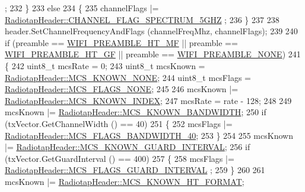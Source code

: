 \begin{DoxyCode}
      ;
232           \}
233         \textcolor{keywordflow}{else}
234           \{
235             channelFlags |= \hyperlink{classns3_1_1RadiotapHeader_a26df5fbb86499c692bd97a99781c8140acfb568bbac292324781feea8775ea1a1}{RadiotapHeader::CHANNEL\_FLAG\_SPECTRUM\_5GHZ}
      ;
236           \}
237 
238         header.SetChannelFrequencyAndFlags (channelFreqMhz, channelFlags);
239 
240         \textcolor{keywordflow}{if} (preamble == \hyperlink{group__wifi_gga5e94a56cb338a14ffbbb19c6a41251ebae0944a664debb28943c12d4cd7a81d2a}{WIFI\_PREAMBLE\_HT\_MF} || preamble == 
      \hyperlink{group__wifi_gga5e94a56cb338a14ffbbb19c6a41251eba82e0b00d79c1f01b7a6e46b693bafd72}{WIFI\_PREAMBLE\_HT\_GF} || preamble == \hyperlink{group__wifi_gga5e94a56cb338a14ffbbb19c6a41251eba97c5c71995de5f28931200e6d5a38a66}{WIFI\_PREAMBLE\_NONE})
241           \{
242             uint8\_t mcsRate = 0;
243             uint8\_t mcsKnown = \hyperlink{classns3_1_1RadiotapHeader_aac7ef91c429fa95640a0e3a996b6741da5f2972d03b27b90f0dbdc5a903e2decc}{RadiotapHeader::MCS\_KNOWN\_NONE};
244             uint8\_t mcsFlags = \hyperlink{classns3_1_1RadiotapHeader_a81a58a7c4281df7ce21fb72c5ed181c3a67178ec6513d916afcecb853ff28879a}{RadiotapHeader::MCS\_FLAGS\_NONE};
245 
246             mcsKnown |= \hyperlink{classns3_1_1RadiotapHeader_aac7ef91c429fa95640a0e3a996b6741daab8509a5cfee677782d45ad3bca2cac2}{RadiotapHeader::MCS\_KNOWN\_INDEX};
247             mcsRate = rate - 128;
248 
249             mcsKnown |= \hyperlink{classns3_1_1RadiotapHeader_aac7ef91c429fa95640a0e3a996b6741da7bbfbd0cfea7cfe806ec9dee40c8565b}{RadiotapHeader::MCS\_KNOWN\_BANDWIDTH};
250             \textcolor{keywordflow}{if} (txVector.GetChannelWidth () == 40)
251               \{
252                 mcsFlags |= \hyperlink{classns3_1_1RadiotapHeader_a81a58a7c4281df7ce21fb72c5ed181c3ab773f6bda0fb799641002df6fa7999b3}{RadiotapHeader::MCS\_FLAGS\_BANDWIDTH\_40};
253               \}
254 
255             mcsKnown |= \hyperlink{classns3_1_1RadiotapHeader_aac7ef91c429fa95640a0e3a996b6741da5dbf7e5fad03d398c6e4e0c349052c6c}{RadiotapHeader::MCS\_KNOWN\_GUARD\_INTERVAL};
256             \textcolor{keywordflow}{if} (txVector.GetGuardInterval () == 400)
257               \{
258                 mcsFlags |= \hyperlink{classns3_1_1RadiotapHeader_a81a58a7c4281df7ce21fb72c5ed181c3acc0e1e46ecea2243688341d5aa31fbb1}{RadiotapHeader::MCS\_FLAGS\_GUARD\_INTERVAL}
      ;
259               \}
260 
261             mcsKnown |= \hyperlink{classns3_1_1RadiotapHeader_aac7ef91c429fa95640a0e3a996b6741da8b123c61d88b5d740e29ed68fb61d167}{RadiotapHeader::MCS\_KNOWN\_HT\_FORMAT};

\end{DoxyCode}
